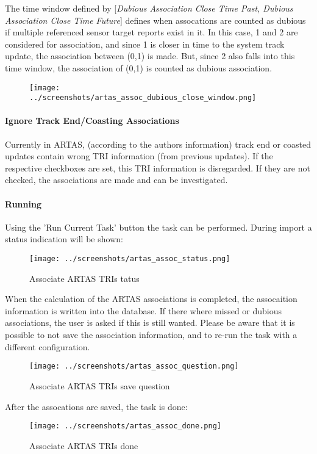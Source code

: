 The time window defined by [\textit{Dubious Association Close Time Past, Dubious Association Close Time Future}] defines when assocations are counted as dubious if multiple referenced sensor target reports exist in it. In this case, 1 and 2 are considered for association, and since 1 is closer in time to the system track update, the association between (0,1) is made. But, since 2 also falls into this time window, the association of (0,1) is counted as dubious association.

\begin{figure}[H]
  \center
    \texttt{[image: ../screenshots/artas\_assoc\_dubious\_close\_window.png]}
\end{figure}


\paragraph{Ignore Track End/Coasting Associations}

Currently in ARTAS, (according to the authors information) track end or coasted updates contain wrong TRI information (from previous updates). If the respective checkboxes are set, this TRI information is disregarded. If they are not checked, the associations are made and can be investigated.

\paragraph{Running}

Using the 'Run Current Task' button the task can be performed. During import a status indication will be shown:

\begin{figure}[H]
  \center
    \texttt{[image: ../screenshots/artas\_assoc\_status.png]}
  \caption{Associate ARTAS TRIs tatus}
\end{figure}

When the calculation of the ARTAS associations is completed, the assocaition information is written into the database. If there where missed or dubious associations, the user is asked if this is still wanted. Please be aware that it is possible to not save the association information, and to re-run the task with a different configuration.

\begin{figure}[H]
  \center
    \texttt{[image: ../screenshots/artas\_assoc\_question.png]}
  \caption{Associate ARTAS TRIs save question}
\end{figure}

After the assocations are saved, the task is done:

\begin{figure}[H]
  \center
    \texttt{[image: ../screenshots/artas\_assoc\_done.png]}
  \caption{Associate ARTAS TRIs done}
\end{figure}


